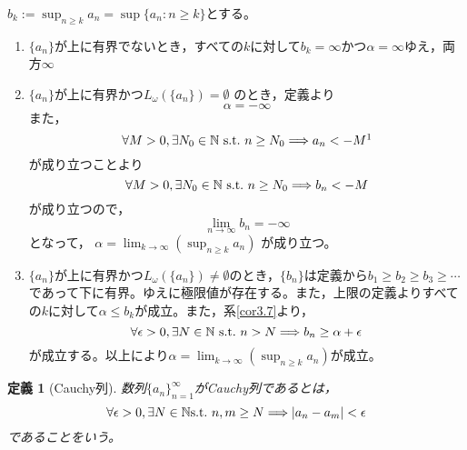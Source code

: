 \documentclass[dvipdfmx,a4j,10pt]{jsarticle}
\makeatletter
\theoremstyle{mystyle1}
\newtheorem{dfn}{定義}[part]
\theoremstyle{mystyle2}
\renewenvironment{proof}[1][\proofname]{\par
  \pushQED{\qed}%
  \normalfont
  \topsep6\p@\@plus6\p@ \trivlist
  \item[\hskip\labelsep{\bfseries\sffamily #1}]\ignorespaces
}{%
  \popQED\endtrivlist\@endpefalse
}
\renewcommand\proofname{証明}
\makeatother
\begin{document}
\begin{proof}[注意\ref{rem3.8}の証明]
    $\displaystyle b_k:=\sup_{n\geq k}a_n=\sup\{a_n:n\geq k\}$とする。
    \begin{enumerate}
        \renewcommand{\labelenumi}{Case\arabic{enumi}.}
        \item $\{a_n\}$が上に有界でないとき，すべての$k$に対して$b_k=\infty$かつ$\alpha=\infty$ゆえ，両方$\infty$
        \item $\{a_n\}$が上に有界かつ$L_\omega(\{a_n\})=\emptyset$
        のとき，定義より
        \[\alpha=-\infty\]
        また，
        \[\forall M>0,\exists N_0\in\mathbb{N}\ {\rm s.t.}\ n\geq N_0\Longrightarrow a_n<-M\footnotemark \]
        が成り立つことより
        \[\forall M>0,\exists N_0\in\mathbb{N}\ {\rm s.t.}\ n\geq N_0 \Longrightarrow b_n<-M\]
        が成り立つので，
        \[\lim_{n\to\infty}b_n=-\infty\]
        となって，
        $\displaystyle\alpha=\lim_{k\to\infty}\left(\sup_{n\geq k}a_n\right)$
        が成り立つ。
        \item $\{a_n\}$が上に有界かつ$L_\omega(\{a_n\})\neq\emptyset$のとき，$\{b_n\}$は定義から$b_1\geq b_2\geq b_3\geq\cdots$であって下に有界。ゆえに極限値が存在する。また，上限の定義よりすべての$k$に対して$\alpha\leq b_k$が成立。また，系\ref{cor3.7}より，
        \[\forall \epsilon>0,\exists N\in\mathbb{N}\ {\rm s.t.}\ n>N\Longrightarrow b_n\geq \alpha+\epsilon\]
        が成立する。以上により$\displaystyle\alpha=\lim_{k\to\infty}\left(\sup_{n\geq k}a_n\right)$が成立。
    \end{enumerate}
\end{proof}

\begin{framed}
    \begin{dfn}[Cauchy列]\label{cauchyretu}
    	数列$\{a_n\}_{n=1}^\infty$がCauchy列であるとは，
    	\[\forall\epsilon>0,\exists N\in\mathbb{N}{\rm s.t.}\ n,m\geq N\Longrightarrow |a_n-a_m|<\epsilon\]
    	であることをいう。
    \end{dfn}
\end{framed}
\end{document}
